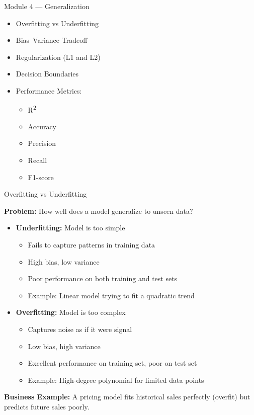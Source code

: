 \documentclass{beamer}
\begin{document}
\begin{frame}{Module 4 — Generalization}
\begin{itemize}
    \item Overfitting vs Underfitting
    \item Bias–Variance Tradeoff
    \item Regularization (L1 and L2)
    \item Decision Boundaries
    \item Performance Metrics:
    \begin{itemize}
        \item R\textsuperscript{2}
        \item Accuracy
        \item Precision
        \item Recall
        \item F1-score
    \end{itemize}
\end{itemize}
\end{frame}

\begin{frame}{Overfitting vs Underfitting}

\textbf{Problem:} How well does a model generalize to unseen data?

\vspace{0.5cm}

\begin{itemize}
    \item \textbf{Underfitting:} Model is too simple
    \begin{itemize}
        \item Fails to capture patterns in training data
        \item High bias, low variance
        \item Poor performance on both training and test sets
        \item Example: Linear model trying to fit a quadratic trend
    \end{itemize}
    \item \textbf{Overfitting:} Model is too complex
    \begin{itemize}
        \item Captures noise as if it were signal
        \item Low bias, high variance
        \item Excellent performance on training set, poor on test set
        \item Example: High-degree polynomial for limited data points
    \end{itemize}
\end{itemize}

\vspace{0.5cm}

\textbf{Business Example:}  
A pricing model fits historical sales perfectly (overfit) but predicts future sales poorly.

\end{frame}
\end{document}
